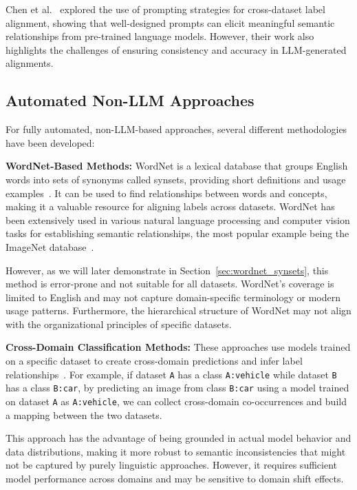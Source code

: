 Chen et al.~\cite{chen_prompting_2023} explored the use of prompting strategies for
cross-dataset label alignment, showing that well-designed prompts can elicit meaningful
semantic relationships from pre-trained language models. However, their work also
highlights the challenges of ensuring consistency and accuracy in LLM-generated
alignments.

\subsection{Automated Non-LLM Approaches}

For fully automated, non-LLM-based approaches, several different methodologies have been
developed:

\textbf{WordNet-Based Methods:} WordNet is a lexical database that groups English words
into sets of synonyms called synsets, providing short definitions and usage
examples~\cite{noauthor_wordnet_nodate,fellbaum_wordnet_1998}.
It can be used to find relationships between words
and concepts, making it a valuable resource for aligning labels across datasets. WordNet
has been extensively used in various natural language processing and computer vision
tasks for establishing semantic relationships,
the most popular example being the ImageNet database~\cite{deng_imagenet_2009}.

However, as we will later demonstrate in Section~\ref{sec:wordnet_synsets}, this method
is error-prone and not suitable for all datasets. WordNet's coverage is limited to
English and may not capture domain-specific terminology or modern usage patterns.
Furthermore, the hierarchical structure of WordNet may not align with the organizational
principles of specific datasets.

\textbf{Cross-Domain Classification Methods:} These approaches use models trained on a
specific dataset to create cross-domain predictions and infer label
relationships~\cite{uijlings_missing_2022,bevandic_automatic_2022,bevandic_weakly_2024}.
For example, if dataset \texttt{A} has a class \texttt{A:vehicle} while dataset
\texttt{B} has a class \texttt{B:car}, by predicting an image from class \texttt{B:car}
using a model trained on dataset \texttt{A} as \texttt{A:vehicle}, we can collect
cross-domain co-occurrences and build a mapping between the two datasets.

This approach has the advantage of being grounded in actual model behavior and data
distributions, making it more robust to semantic inconsistencies that might not be
captured by purely linguistic approaches. However, it requires sufficient model
performance across domains and may be sensitive to domain shift effects.

